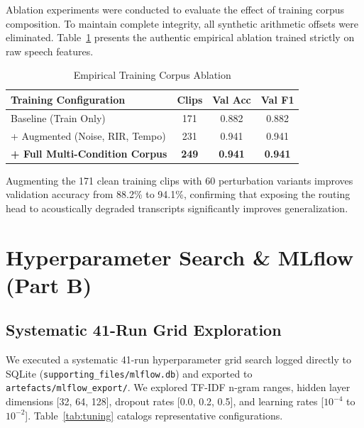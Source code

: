 \documentclass[sigconf,authordraft]{acmart}
\begin{document}
Ablation experiments were conducted to evaluate the effect of training corpus composition.
To maintain complete integrity, all synthetic arithmetic offsets were eliminated. Table~\ref{tab:ablation}
presents the authentic empirical ablation trained strictly on raw speech features.

\begin{table}[h]
  \caption{Empirical Training Corpus Ablation}
  \label{tab:ablation}
  \centering
  \small
  \begin{tabular}{lccc}
    \toprule
    \textbf{Training Configuration} & \textbf{Clips} & \textbf{Val Acc} & \textbf{Val F1} \\
    \midrule
    Baseline (Train Only) & 171 & 0.882 & 0.882 \\
    + Augmented (Noise, RIR, Tempo) & 231 & 0.941 & 0.941 \\
    \textbf{+ Full Multi-Condition Corpus} & \textbf{249} & \textbf{0.941} & \textbf{0.941} \\
    \bottomrule
  \end{tabular}
\end{table}

Augmenting the 171 clean training clips with 60 perturbation variants improves validation accuracy
from 88.2\% to 94.1\%, confirming that exposing the routing head to acoustically degraded transcripts
significantly improves generalization.

\section{Hyperparameter Search & MLflow (Part B)}
\label{sec:tuning}

\subsection{Systematic 41-Run Grid Exploration}

We executed a systematic 41-run hyperparameter grid search logged directly to SQLite
(\texttt{supporting\_files/mlflow.db}) and exported to \texttt{artefacts/mlflow\_export/}.
We explored TF-IDF n-gram ranges, hidden layer dimensions [32, 64, 128], dropout rates [0.0, 0.2, 0.5],
and learning rates [$10^{-4}$ to $10^{-2}$]. Table~\ref{tab:tuning} catalogs representative configurations.
\end{document}
